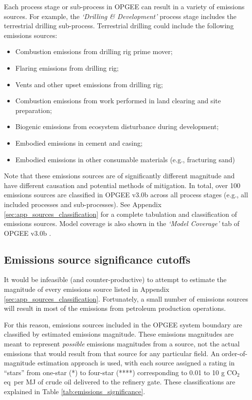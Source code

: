 \documentclass[11pt]{report}
\newcommand{\version}{v3.0b }
\newcommand{\sheet}[1]{\textit{`{#1}'}}
\begin{document}
Each process stage or sub-process in OPGEE can result in a variety of emissions sources. For example, the \sheet{Drilling \& Development} process stage includes the terrestrial drilling sub-process. Terrestrial drilling could include the following emissions sources:
\begin{itemize}
\item Combustion emissions from drilling rig prime mover;
\item Flaring emissions from drilling rig;
\item Vents and other upset emissions from drilling rig;
\item Combustion emissions from work performed in land clearing and site preparation;
\item Biogenic emissions from ecosystem disturbance during development;
\item Embodied emissions in cement and casing;
\item Embodied emissions in other consumable materials (e.g., fracturing sand)
\end{itemize}
Note that these emissions sources are of significantly different magnitude and have different causation and potential methods of mitigation. In total, over 100 emissions sources are classified in OPGEE \version across all process stages (e.g., all included processes and sub-processes). See Appendix \ref{sec:app_sources_classification} for a complete tabulation and classification of emissions sources.  Model coverage is also shown in the \sheet{Model Coverage} tab of OPGEE \version.



\subsection{Emissions source significance cutoffs}

It would be infeasible (and counter-productive) to attempt to estimate the magnitude of every emissions source listed in Appendix \ref{sec:app_sources_classification}. Fortunately, a small number of emissions sources will result in most of the emissions from petroleum production operations. 

For this reason, emissions sources included in the OPGEE system boundary are classified by estimated emissions magnitude. These emissions magnitudes are meant to represent \emph{possible} emissions magnitudes from a source, not the actual emissions that would result from that source for any particular field. An order-of-magnitude estimation approach is used, with each source assigned a rating in ``stars'' from one-star (*) to four-star (****) corresponding to 0.01 to 10 g CO$_2$ eq\ per MJ of crude oil delivered to the refinery gate. These classifications are explained in Table \ref{tab:emissions_significance}.
\end{document}
